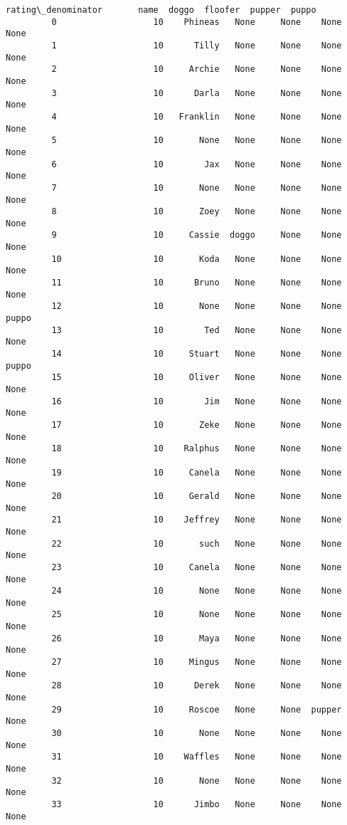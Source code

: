 \documentclass[11pt]{article}
\begin{document}
\begin{Verbatim}[commandchars=\\\{\}]
             rating\_denominator       name  doggo  floofer  pupper  puppo  
         0                   10    Phineas   None     None    None   None  
         1                   10      Tilly   None     None    None   None  
         2                   10     Archie   None     None    None   None  
         3                   10      Darla   None     None    None   None  
         4                   10   Franklin   None     None    None   None  
         5                   10       None   None     None    None   None  
         6                   10        Jax   None     None    None   None  
         7                   10       None   None     None    None   None  
         8                   10       Zoey   None     None    None   None  
         9                   10     Cassie  doggo     None    None   None  
         10                  10       Koda   None     None    None   None  
         11                  10      Bruno   None     None    None   None  
         12                  10       None   None     None    None  puppo  
         13                  10        Ted   None     None    None   None  
         14                  10     Stuart   None     None    None  puppo  
         15                  10     Oliver   None     None    None   None  
         16                  10        Jim   None     None    None   None  
         17                  10       Zeke   None     None    None   None  
         18                  10    Ralphus   None     None    None   None  
         19                  10     Canela   None     None    None   None  
         20                  10     Gerald   None     None    None   None  
         21                  10    Jeffrey   None     None    None   None  
         22                  10       such   None     None    None   None  
         23                  10     Canela   None     None    None   None  
         24                  10       None   None     None    None   None  
         25                  10       None   None     None    None   None  
         26                  10       Maya   None     None    None   None  
         27                  10     Mingus   None     None    None   None  
         28                  10      Derek   None     None    None   None  
         29                  10     Roscoe   None     None  pupper   None  
         30                  10       None   None     None    None   None  
         31                  10    Waffles   None     None    None   None  
         32                  10       None   None     None    None   None  
         33                  10      Jimbo   None     None    None   None  

\end{Verbatim}
\end{document}
